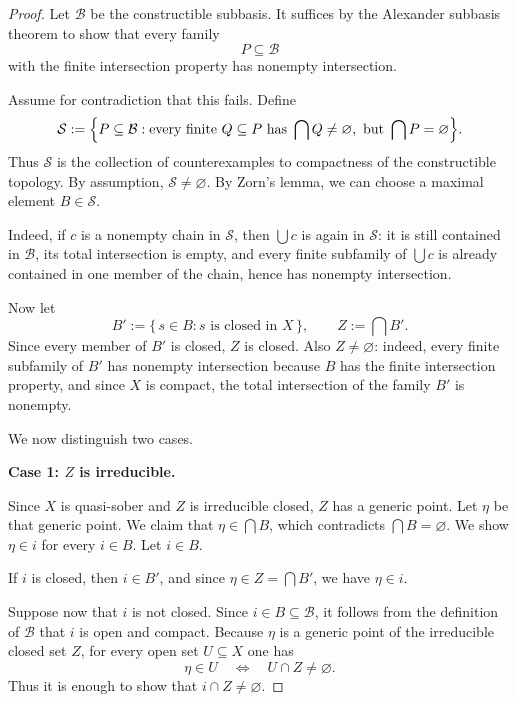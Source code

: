 \documentclass{article}
\begin{document}
\begin{proof}
Let \(\mathcal B\) be the constructible subbasis. It suffices by the Alexander subbasis theorem to show that
every family
\[
P \subseteq \mathcal B
\]
with the finite intersection property has nonempty intersection.

Assume for contradiction that this fails. Define
\[
\mathcal S
:=
\Bigl\{
P \subseteq \mathcal B :
\text{every finite } Q \subseteq P \text{ has } \bigcap Q \neq \varnothing,
\text{ but } \bigcap P = \varnothing
\Bigr\}.
\]
Thus \(\mathcal S\) is the collection of counterexamples to compactness of the constructible
topology. By assumption, \(\mathcal S\neq\varnothing\). By Zorn's lemma, we can choose a maximal element \(B \in \mathcal S\).

Indeed, if \(c\) is a nonempty chain in \(\mathcal S\), then \(\bigcup c\) is again in
\(\mathcal S\): it is still contained in \(\mathcal B\), its total intersection is empty,
and every finite subfamily of \(\bigcup c\) is already contained in one member of the chain,
hence has nonempty intersection.

Now let
\[
B' := \{\, s \in B : s \text{ is closed in } X \,\},
\qquad
Z := \bigcap B'.
\]
Since every member of \(B'\) is closed, \(Z\) is closed. Also \(Z\neq\varnothing\):
indeed, every finite subfamily of \(B'\) has nonempty intersection because \(B\) has the finite
intersection property, and since \(X\) is compact, the total intersection of the family \(B'\)
is nonempty.

We now distinguish two cases.

\noindent\textbf{Case 1: \(Z\) is irreducible.}

Since \(X\) is quasi-sober and \(Z\) is irreducible closed, \(Z\) has a generic point. Let \(\eta\) be that generic point. We claim that \(\eta \in \bigcap B\), which contradicts \(\bigcap B=\varnothing\). We show \(\eta \in i\) for every $i \in B$. Let $i \in B$. 

If \(i\) is closed, then \(i \in B'\), and since \(\eta \in Z=\bigcap B'\), we have \(\eta \in i\).

Suppose now that \(i\) is not closed. Since \(i \in B \subseteq \mathcal B\), it follows from the
definition of \(\mathcal B\) that \(i\) is open and compact.
Because \(\eta\) is a generic point of the irreducible closed set \(Z\), for every open set
\(U \subseteq X\) one has
\[
\eta \in U
\quad\Longleftrightarrow\quad
U \cap Z \neq \varnothing.
\]
Thus it is enough to show that \(i \cap Z \neq \varnothing\).


\end{proof}
\end{document}
